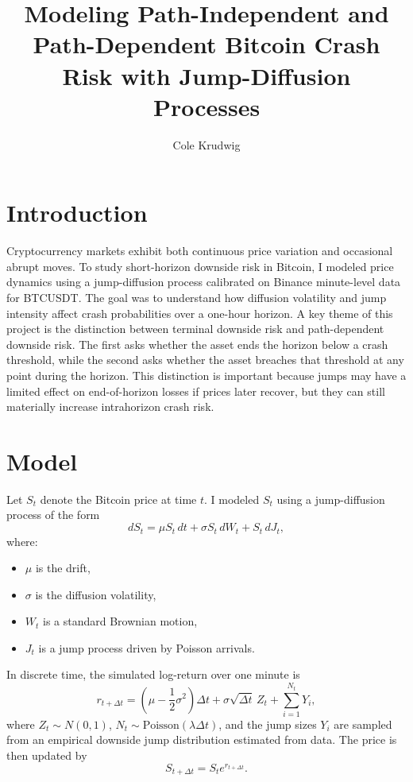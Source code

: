 \documentclass[11pt]{article}
\title{Modeling Path-Independent and Path-Dependent Bitcoin Crash Risk with Jump-Diffusion Processes}
\author{Cole Krudwig}
\begin{document}
\maketitle

\section*{Introduction}

Cryptocurrency markets exhibit both continuous price variation and occasional abrupt moves. To study short-horizon downside risk in Bitcoin, I modeled price dynamics using a jump-diffusion process calibrated on Binance minute-level data for BTCUSDT. The goal was to understand how diffusion volatility and jump intensity affect crash probabilities over a one-hour horizon. A key theme of this project is the distinction between terminal downside risk and path-dependent downside risk. The first asks whether the asset ends the horizon below a crash threshold, while the second asks whether the asset breaches that threshold at any point during the horizon. This distinction is important because jumps may have a limited effect on end-of-horizon losses if prices later recover, but they can still materially increase intrahorizon crash risk.

\section*{Model}

Let \(S_t\) denote the Bitcoin price at time \(t\). I modeled \(S_t\) using a jump-diffusion process of the form
\[
dS_t = \mu S_t\,dt + \sigma S_t\,dW_t + S_t\,dJ_t,
\]
where:
\begin{itemize}
    \item \(\mu\) is the drift,
    \item \(\sigma\) is the diffusion volatility,
    \item \(W_t\) is a standard Brownian motion,
    \item \(J_t\) is a jump process driven by Poisson arrivals.
\end{itemize}

In discrete time, the simulated log-return over one minute is
\[
r_{t+\Delta t}
=
\left(\mu - \frac{1}{2}\sigma^2\right)\Delta t
+
\sigma \sqrt{\Delta t}\, Z_t
+
\sum_{i=1}^{N_t} Y_i,
\]
where \(Z_t \sim N(0,1)\), \(N_t \sim \text{Poisson}(\lambda \Delta t)\), and the jump sizes \(Y_i\) are sampled from an empirical downside jump distribution estimated from data. The price is then updated by
\[
S_{t+\Delta t} = S_t e^{r_{t+\Delta t}}.
\]
\end{document}
